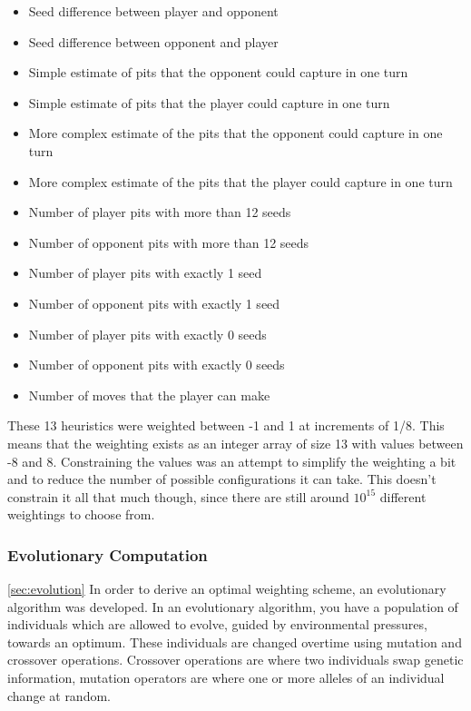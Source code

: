 \documentclass[]{article}
\begin{document}

\begin{itemize}
\item Seed difference between player and opponent
\item Seed difference between opponent and player
\item Simple estimate of pits that the opponent could capture in one turn
\item Simple estimate of pits that the player could capture in one turn
\item More complex estimate of the pits that the opponent could capture in one turn
\item More complex estimate of the pits that the player could capture in one turn
\item Number of player pits with more than 12 seeds
\item Number of opponent pits with more than 12 seeds
\item Number of player pits with exactly 1 seed
\item Number of opponent pits with exactly 1 seed
\item Number of player pits with exactly 0 seeds
\item Number of opponent pits with exactly 0 seeds
\item Number of moves that the player can make
\end{itemize}

These 13 heuristics were weighted between -1 and 1 at increments of 1/8. This means that the weighting exists as an integer array of size 13 with values between -8 and 8. Constraining the values was an attempt to simplify the weighting a bit and to reduce the number of possible configurations it can take. This doesn't constrain it all that much though, since there are still around $10^15$ different weightings to choose from. 

\subsubsection{Evolutionary Computation}
\ref{sec:evolution}
In order to derive an optimal weighting scheme, an evolutionary algorithm was developed. In an evolutionary algorithm, you have a population of individuals which are allowed to evolve, guided by environmental pressures, towards an optimum. These individuals are changed overtime using mutation and crossover operations. Crossover operations are where two individuals swap genetic information, mutation operators are where one or more alleles of an individual change at random. 
\end{document}
